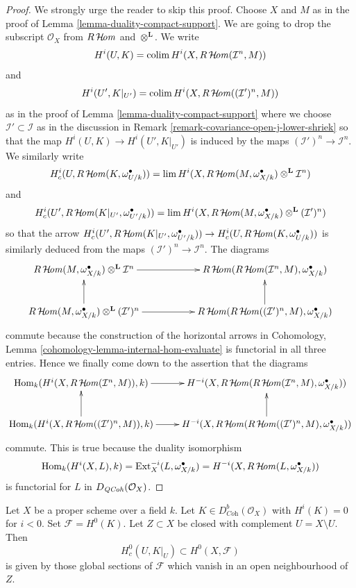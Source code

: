 \begin{proof}
We strongly urge the reader to skip this proof. Choose $X$ and $M$ as
in the proof of Lemma \ref{lemma-duality-compact-support}. We are going to drop
the subscript $\mathcal{O}_X$ from $R\mathop{\mathcal{H}\!\mathit{om}}\nolimits$ and $\otimes^\mathbf{L}$.
We write
$$
H^i(U, K) = \mathop{\mathrm{colim}}\nolimits H^i(X, R\mathop{\mathcal{H}\!\mathit{om}}\nolimits(\mathcal{I}^n, M))
$$
and
$$
H^i(U', K|_{U'}) = \mathop{\mathrm{colim}}\nolimits H^i(X, R\mathop{\mathcal{H}\!\mathit{om}}\nolimits((\mathcal{I}')^n, M))
$$
as in the proof of Lemma \ref{lemma-duality-compact-support} where we choose
$\mathcal{I}' \subset \mathcal{I}$ as in the discussion in
Remark \ref{remark-covariance-open-j-lower-shriek} so that the map
$H^i(U, K) \to H^i(U', K|_{U'})$ is induced by the maps
$(\mathcal{I}')^n \to \mathcal{I}^n$.
We similarly write
$$
H^i_c(U, R\mathop{\mathcal{H}\!\mathit{om}}\nolimits(K, \omega_{U/k}^\bullet)) =
\mathop{\mathrm{lim}}\nolimits H^i(X,  R\mathop{\mathcal{H}\!\mathit{om}}\nolimits(M, \omega_{X/k}^\bullet)
\otimes^\mathbf{L} \mathcal{I}^n)
$$
and
$$
H^i_c(U', R\mathop{\mathcal{H}\!\mathit{om}}\nolimits(K|_{U'}, \omega_{U'/k}^\bullet)) =
\mathop{\mathrm{lim}}\nolimits H^i(X,  R\mathop{\mathcal{H}\!\mathit{om}}\nolimits(M, \omega_{X/k}^\bullet)
\otimes^\mathbf{L} (\mathcal{I}')^n)
$$
so that the arrow $H^i_c(U', R\mathop{\mathcal{H}\!\mathit{om}}\nolimits(K|_{U'}, \omega_{U'/k}^\bullet))
\to H^i_c(U, R\mathop{\mathcal{H}\!\mathit{om}}\nolimits(K, \omega_{U/k}^\bullet))$ is similarly
deduced from the maps $(\mathcal{I}')^n \to \mathcal{I}^n$.
The diagrams
$$
\xymatrix{
R\SheafHom(M, \omega_{X/k}^\bullet)
\otimes^\mathbf{L} \mathcal{I}^n
\ar[rr] & &
R\SheafHom(R\SheafHom(\mathcal{I}^n, M), \omega_{X/k}^\bullet) \\
R\SheafHom(M, \omega_{X/k}^\bullet) \otimes^\mathbf{L} (\mathcal{I}')^n
\ar[rr] \ar[u] & &
R\SheafHom(R\SheafHom((\mathcal{I}')^n, M), \omega_{X/k}^\bullet) \ar[u]
}
$$
commute because the construction of the horizontal arrows in
Cohomology, Lemma \ref{cohomology-lemma-internal-hom-evaluate}
is functorial in all three entries. Hence we finally come down
to the assertion that the diagrams
$$
\xymatrix{
\Hom_k(H^i(X, R\SheafHom(\mathcal{I}^n, M)), k) \ar[r] &
H^{-i}(X, R\SheafHom(R\SheafHom(
\mathcal{I}^n, M), \omega_{X/k}^\bullet)) \\
\Hom_k(H^i(X, R\SheafHom((\mathcal{I}')^n, M)), k) \ar[r] \ar[u] &
H^{-i}(X, R\SheafHom(R\SheafHom(
(\mathcal{I}')^n, M), \omega_{X/k}^\bullet)) \ar[u]
}
$$
commute. This is true because the duality isomorphism
$$
\mathop{\mathrm{Hom}}\nolimits_k(H^i(X, L), k) = \mathop{\mathrm{Ext}}\nolimits^{-i}_X(L, \omega_{X/k}^\bullet) =
H^{-i}(X, R\mathop{\mathcal{H}\!\mathit{om}}\nolimits(L, \omega_{X/k}^\bullet))
$$
is functorial for $L$ in $D_{\mathit{QCoh}}(\mathcal{O}_X)$.
\end{proof}

\begin{lemma}
\label{lemma-h0-compactly-supported}
Let $X$ be a proper scheme over a field $k$. Let
$K \in D^b_{\textit{Coh}}(\mathcal{O}_X)$ with $H^i(K) = 0$
for $i < 0$. Set $\mathcal{F} = H^0(K)$.
Let $Z \subset X$ be closed with complement $U = X \setminus U$.
Then
$$
H^0_c(U, K|_U) \subset H^0(X, \mathcal{F})
$$
is given by those global sections of $\mathcal{F}$ which
vanish in an open neighbourhood of $Z$.
\end{lemma}

